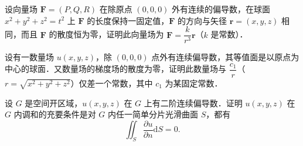 \begin{xiti}
\item 设向量场 $\bm{F}=(P,Q,R)$ 在除原点 $(0,0,0)$ 外有连续的偏导数，在球面 $x^{2}+y^{2}+z^{2}=t^{2}$ 上 $\bm{F}$ 的长度保持一固定值，$\bm{F}$ 的方向与矢径 $\bm{r}=(x,y,z)$ 相同，而且 $\bm{F}$ 的散度恒为零，证明此向量场为 $\bm{F}=\dfrac{k}{r^{3}}\bm{r}$（$k$ 是常数）．
\item 设有一数量场 $u(x,y,z)$，除 $(0,0,0)$ 点外有连续偏导数，其等值面是以原点为中心的球面．又数量场的梯度场的散度为零，证明此数量场与 $\dfrac{c_{1}}{r}$（$r=\sqrt{x^{2}+y^{2}+z^{2}}$）仅差一个常数，其中 $c_{1}$ 为某固定常数．
\item 设 $G$ 是空间开区域，$u(x,y,z)$ 在 $G$ 上有二阶连续偏导数．证明 $u(x,y,z)$ 在 $G$ 内调和的充要条件是对 $G$ 内任一简单分片光滑曲面 $S$，都有
\[
\iint_{S}\frac{\partial u}{\partial n}\mathrm{d}S=0.
\]
\end{xiti}
